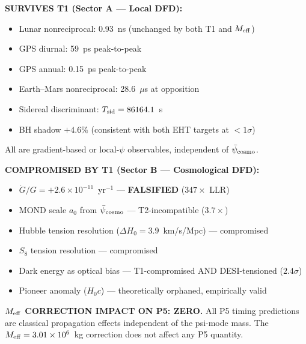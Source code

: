 \documentclass[11pt]{article}
\newcommand{\ee}[1]{\times 10^{#1}}
\newcommand{\psicosmo}{\bar{\psi}_{\rm cosmo}}
\newcommand{\Meff}{M_{\rm eff}}
\newcommand{\Hzero}{H_0}
\begin{document}
\begin{tcolorbox}[colback=blue!5!white, colframe=blue!60!black,
  title=\textbf{W3i5 P5 Summary: The Survivorship Map}]

\textbf{SURVIVES T1 (Sector A --- Local DFD):}
\begin{itemize}[nosep]
\item Lunar nonreciprocal: 0.93~ns (unchanged by both T1 and $\Meff$)
\item GPS diurnal: 59~ps peak-to-peak
\item GPS annual: 0.15~ps peak-to-peak
\item Earth--Mars nonreciprocal: 28.6~$\mu$s at opposition
\item Sidereal discriminant: $T_{\rm sid} = 86164.1$~s
\item BH shadow $+4.6\%$ (consistent with both EHT targets at $< 1\sigma$)
\end{itemize}
All are gradient-based or local-$\psi$ observables, independent of $\psicosmo$.

\textbf{COMPROMISED BY T1 (Sector B --- Cosmological DFD):}
\begin{itemize}[nosep]
\item $\dot{G}/G = +2.6\ee{-11}$~yr$^{-1}$ --- \textbf{FALSIFIED} ($347\times$ LLR)
\item MOND scale $a_0$ from $\psicosmo$ --- T2-incompatible ($3.7\times$)
\item Hubble tension resolution ($\Delta\Hzero = 3.9$~km/s/Mpc) --- compromised
\item $S_8$ tension resolution --- compromised
\item Dark energy as optical bias --- T1-compromised AND DESI-tensioned ($2.4\sigma$)
\item Pioneer anomaly ($\Hzero c$) --- theoretically orphaned, empirically valid
\end{itemize}

\textbf{$\Meff$ CORRECTION IMPACT ON P5: ZERO.}
All P5 timing predictions are classical propagation effects independent of
the psi-mode mass. The $\Meff = 3.01\ee{6}$~kg correction does not affect
any P5 quantity.
\end{tcolorbox}
\end{document}

